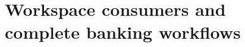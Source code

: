 \chapter{Workspace consumers and complete banking workflows}
\label{in:consumers}
\label{exec13:i3-start}





\label{exec13:i3-end}
